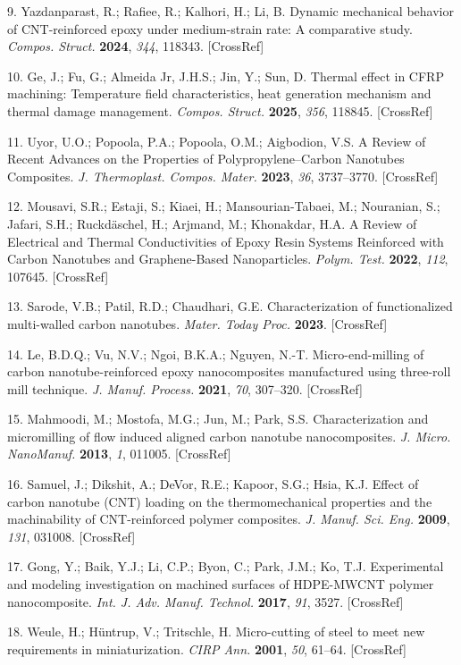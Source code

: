 \documentclass{article}
\begin{document}
\begin{hangpars}
9. Yazdanparast, R.; Rafiee, R.; Kalhori, H.; Li, B. Dynamic mechanical behavior of CNT-reinforced epoxy under medium-strain rate: A comparative study. \emph{Compos. Struct.} \textbf{2024}, \emph{344}, 118343. [CrossRef]

10. Ge, J.; Fu, G.; Almeida Jr, J.H.S.; Jin, Y.; Sun, D. Thermal effect in CFRP machining: Temperature field characteristics, heat generation mechanism and thermal damage management. \emph{Compos. Struct.} \textbf{2025}, \emph{356}, 118845. [CrossRef]

11. Uyor, U.O.; Popoola, P.A.; Popoola, O.M.; Aigbodion, V.S. A Review of Recent Advances on the Properties of Polypropylene–Carbon Nanotubes Composites. \emph{J. Thermoplast. Compos. Mater.} \textbf{2023}, \emph{36}, 3737–3770. [CrossRef]

12. Mousavi, S.R.; Estaji, S.; Kiaei, H.; Mansourian-Tabaei, M.; Nouranian, S.; Jafari, S.H.; Ruckdäschel, H.; Arjmand, M.; Khonakdar, H.A. A Review of Electrical and Thermal Conductivities of Epoxy Resin Systems Reinforced with Carbon Nanotubes and Graphene-Based Nanoparticles. \emph{Polym. Test.} \textbf{2022}, \emph{112}, 107645. [CrossRef]

13. Sarode, V.B.; Patil, R.D.; Chaudhari, G.E. Characterization of functionalized multi-walled carbon nanotubes. \emph{Mater. Today Proc.} \textbf{2023}. [CrossRef]

14. Le, B.D.Q.; Vu, N.V.; Ngoi, B.K.A.; Nguyen, N.-T. Micro-end-milling of carbon nanotube-reinforced epoxy nanocomposites manufactured using three-roll mill technique. \emph{J. Manuf. Process.} \textbf{2021}, \emph{70}, 307–320. [CrossRef]

15. Mahmoodi, M.; Mostofa, M.G.; Jun, M.; Park, S.S. Characterization and micromilling of flow induced aligned carbon nanotube nanocomposites. \emph{J. Micro. NanoManuf.} \textbf{2013}, \emph{1}, 011005. [CrossRef]

16. Samuel, J.; Dikshit, A.; DeVor, R.E.; Kapoor, S.G.; Hsia, K.J. Effect of carbon nanotube (CNT) loading on the thermomechanical properties and the machinability of CNT-reinforced polymer composites. \emph{J. Manuf. Sci. Eng.} \textbf{2009}, \emph{131}, 031008. [CrossRef]

17. Gong, Y.; Baik, Y.J.; Li, C.P.; Byon, C.; Park, J.M.; Ko, T.J. Experimental and modeling investigation on machined surfaces of HDPE-MWCNT polymer nanocomposite. \emph{Int. J. Adv. Manuf. Technol.} \textbf{2017}, \emph{91}, 3527. [CrossRef]

18. Weule, H.; Hüntrup, V.; Tritschle, H. Micro-cutting of steel to meet new requirements in miniaturization. \emph{CIRP Ann.} \textbf{2001}, \emph{50}, 61–64. [CrossRef]


\end{hangpars}
\end{document}
